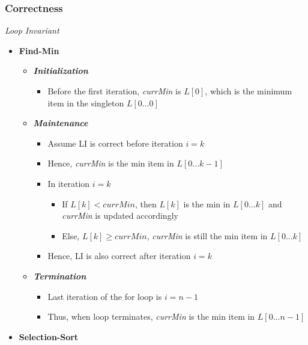 \documentclass[10pt, 
a4paper, 
oneside, 
headinclude, footinclude, 
BCOR5mm]
{scrartcl}
\begin{document}
\subsubsection{Correctness}
\begin{definition}
    \textit{Loop Invariant}
    \begin{itemize}
        \item \textbf{Find-Min}
        \begin{itemize}
            \item \textit{\textbf{Initialization}}
            \begin{itemize}
                \item Before the first iteration, \textit{currMin} is $L[0]$, which is the minimum item in the singleton $L[0...0]$
            \end{itemize}
            \item \textit{\textbf{Maintenance}}
            \begin{itemize}
                \item Assume LI is correct before iteration $i=k$
                \item Hence, \textit{currMin} is the min item in $L[0...k-1]$
                \item In iteration $i=k$
                \begin{itemize}
                    \item If $L[k]<currMin$, then $L[k]$ is the min in $L[0...k]$ and \textit{currMin} is updated accordingly
                    \item Else, $L[k]\geq currMin$, \textit{currMin} is still the min item in $L[0...k]$
                \end{itemize}
                \item Hence, LI is also correct after iteration $i=k$
            \end{itemize}
            \item \textit{\textbf{Termination}}
            \begin{itemize}
                \item Last iteration of the for loop is $i=n-1$
                \item Thus, when loop terminates, \textit{currMin} is the min item in $L[0...n-1]$
            \end{itemize}
        \end{itemize}
        \item \textbf{Selection-Sort}
        \begin{itemize}

\end{itemize}
\end{itemize}
\end{definition}
\end{document}
